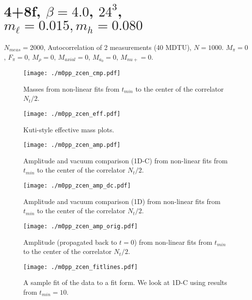 \documentclass[pdftex,letterpaper,10pt]{article}
\begin{document}
\section{4+8f, $\beta = 4.0$, $24^3$, $m_\ell = 0.015, m_h = 0.080$}

$N_{meas} = 2000$, Autocorrelation of 2 measurements (40 MDTU), $N = 1000$. $M_\pi = 0$, $F_\pi = 0$, $M_\rho = 0$, $M_{axial} = 0$, $M_{a_0} = 0$, $M_{nu+} = 0$. 



\begin{multicols}{2}
	\begin{figure}[H]
\centering
        \texttt{[image: ./m0pp\_zcen\_cmp.pdf]}\\
	\caption{Masses from non-linear fits from $t_{min}$ to the center of the correlator $N_t/2$.}
\end{figure}
\columnbreak
\begin{figure}[H]
\centering
    \texttt{[image: ./m0pp\_zcen\_eff.pdf]}\\
	\caption{Kuti-style effective mass plots. }
\end{figure}
\end{multicols}

\begin{multicols}{2}
	\begin{figure}[H]
\centering
        \texttt{[image: ./m0pp\_zcen\_amp.pdf]}\\
	\caption{Amplitude and vacuum comparison (1D-C) from non-linear fits from $t_{min}$ to the center of the correlator $N_t/2$.}
\end{figure}
\columnbreak
\begin{figure}[H]
\centering
    \texttt{[image: ./m0pp\_zcen\_amp\_dc.pdf]}\\
	\caption{Amplitude and vacuum comparison (1D) from non-linear fits from $t_{min}$ to the center of the correlator $N_t/2$.}
\end{figure}
\end{multicols}

\begin{multicols}{2}
	\begin{figure}[H]
\centering
        \texttt{[image: ./m0pp\_zcen\_amp\_orig.pdf]}\\
	\caption{Amplitude (propagated back to $t=0$) from non-linear fits from $t_{min}$ to the center of the correlator $N_t/2$.}
\end{figure}
\columnbreak
\begin{figure}[H]
\centering
        \texttt{[image: ./m0pp\_zcen\_fitlines.pdf]}\\
        \caption{A sample fit of the data to a fit form. We look at 1D-C using results from $t_{min} = 10$.}
\end{figure}
\end{multicols}
\end{document}
